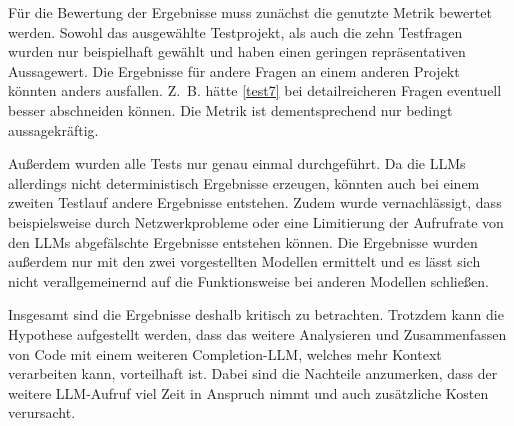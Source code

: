 \documentclass[../main.tex]{subfiles}
\begin{document}
Für die Bewertung der Ergebnisse muss zunächst die genutzte Metrik bewertet werden.
Sowohl das ausgewählte Testprojekt, als auch die zehn Testfragen wurden nur beispielhaft gewählt und haben einen geringen repräsentativen Aussagewert.
Die Ergebnisse für andere Fragen an einem anderen Projekt könnten anders ausfallen.
Z. B. hätte \ref{test7} bei detailreicheren Fragen eventuell besser abschneiden können.
Die Metrik ist dementsprechend nur bedingt aussagekräftig.

Außerdem wurden alle Tests nur genau einmal durchgeführt. 
Da die \glspl{LLM} allerdings nicht deterministisch Ergebnisse erzeugen, könnten auch bei einem zweiten Testlauf andere Ergebnisse entstehen.
Zudem wurde vernachlässigt, dass beispielsweise durch Netzwerkprobleme oder eine Limitierung der Aufrufrate von den \glspl{LLM} abgefälschte Ergebnisse entstehen können.
Die Ergebnisse wurden außerdem nur mit den zwei vorgestellten Modellen ermittelt und es lässt sich nicht verallgemeinernd auf die Funktionsweise bei anderen Modellen schließen.

Insgesamt sind die Ergebnisse deshalb kritisch zu betrachten.
Trotzdem kann die Hypothese aufgestellt werden, dass das weitere Analysieren und Zusammenfassen von Code mit einem weiteren Completion-\gls{LLM}, welches mehr Kontext verarbeiten kann, vorteilhaft ist.
Dabei sind die Nachteile anzumerken, dass der weitere \gls{LLM}-Aufruf viel Zeit in Anspruch nimmt und auch zusätzliche Kosten verursacht. 
\end{document}
